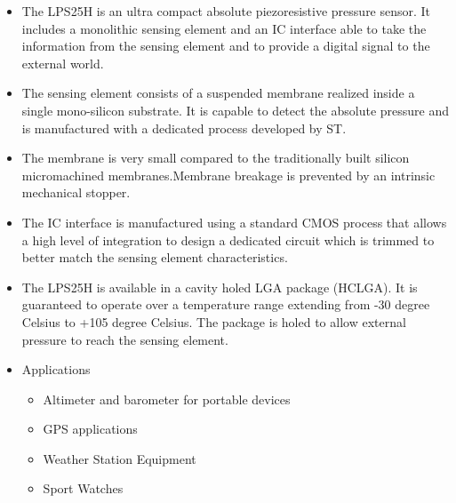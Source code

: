 \documentclass[11pt,a4paper]{article}
\begin{document}
\begin{itemize}
\item The LPS25H is an ultra compact absolute piezoresistive pressure sensor. It includes a
monolithic sensing element and an IC interface
able to take the information from the sensing
element and to provide a digital signal to the
external world.

\item The sensing element consists of a suspended
membrane realized inside a single mono-silicon
substrate. It is capable to detect the absolute
pressure and is manufactured with a dedicated
process developed by ST.

\item The membrane is very small compared to the
traditionally built silicon micromachined
membranes.Membrane breakage is prevented
by an intrinsic mechanical stopper.

\item The IC interface is manufactured using a standard
CMOS process that allows a high level of
integration to design a dedicated circuit which is
trimmed to better match the sensing element
characteristics.

\item The LPS25H is available in a cavity holed LGA
package (HCLGA). It is guaranteed to operate
over a temperature range extending from -30 degree Celsius
to +105 degree Celsius. The package is holed to allow
external pressure to reach the sensing element.

\item Applications
\begin{itemize}
\item Altimeter and barometer for portable devices
\item GPS applications
\item Weather Station Equipment
\item Sport Watches
\end{itemize}


\newpage

\end{itemize}
\end{document}
